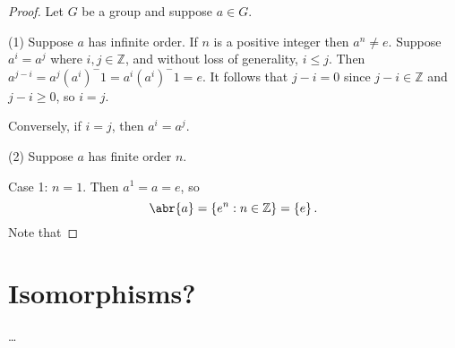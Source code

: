 \documentclass[11pt]{article}
\newcommand{\br}[1]{\left(#1\right)}
\newcommand{\cbr}[1]{\left\{#1\right\}}
\theoremstyle{remark}
\theoremstyle{definition}
\theoremstyle{remark}
\theoremstyle{definition}
\theoremstyle{remark}
\begin{document}
\begin{proof}
    Let $G$ be a group and suppose $a\in G$.
    
    (1) Suppose $a$ has infinite order. If $n$ is a positive integer then $a^n \neq e$. Suppose $a^i = a^j$ where $i,j\in\mathbb{Z}$, and without loss of generality, $i\leq j$. Then $a^{j-i} = a^j\br{a^i}^-1 = a^i\br{a^i}^-1 = e$. It follows that $j-i = 0$ since $j-i\in\mathbb{Z}$ and $j-i\geq 0$, so $i=j$.

    Conversely, if $i=j$, then $a^i = a^j$.

    (2) Suppose $a$ has finite order $n$.

    Case 1: $n = 1$. Then $a^1 = a = e$, so $$\abr{a} = \cbr{e^n : n\in\mathbb{Z}} = \cbr{e}.$$ Note that 
\end{proof}

\section{Isomorphisms?}
\dots
\end{document}
